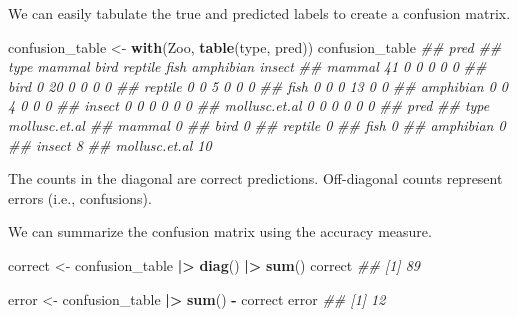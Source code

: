 \documentclass[
  notitlepage]{book}
\newenvironment{Shaded}{\begin{snugshade}}{\end{snugshade}}
\newcommand{\CommentTok}[1]{\textcolor[rgb]{0.56,0.35,0.01}{\textit{#1}}}
\newcommand{\ErrorTok}[1]{\textcolor[rgb]{0.64,0.00,0.00}{\textbf{#1}}}
\newcommand{\KeywordTok}[1]{\textcolor[rgb]{0.13,0.29,0.53}{\textbf{#1}}}
\newcommand{\NormalTok}[1]{#1}
\newcommand{\OperatorTok}[1]{\textcolor[rgb]{0.81,0.36,0.00}{\textbf{#1}}}
\newcommand{\StringTok}[1]{\textcolor[rgb]{0.31,0.60,0.02}{#1}}
\begin{document}
We can easily tabulate the true and predicted labels to create a
confusion matrix.

\begin{Shaded}
\begin{Highlighting}[]
\NormalTok{confusion\_table \textless{}{-}}\StringTok{ }\KeywordTok{with}\NormalTok{(Zoo, }\KeywordTok{table}\NormalTok{(type, pred))}
\NormalTok{confusion\_table}
\CommentTok{\#\#                pred}
\CommentTok{\#\# type            mammal bird reptile fish amphibian insect}
\CommentTok{\#\#   mammal            41    0       0    0         0      0}
\CommentTok{\#\#   bird               0   20       0    0         0      0}
\CommentTok{\#\#   reptile            0    0       5    0         0      0}
\CommentTok{\#\#   fish               0    0       0   13         0      0}
\CommentTok{\#\#   amphibian          0    0       4    0         0      0}
\CommentTok{\#\#   insect             0    0       0    0         0      0}
\CommentTok{\#\#   mollusc.et.al      0    0       0    0         0      0}
\CommentTok{\#\#                pred}
\CommentTok{\#\# type            mollusc.et.al}
\CommentTok{\#\#   mammal                    0}
\CommentTok{\#\#   bird                      0}
\CommentTok{\#\#   reptile                   0}
\CommentTok{\#\#   fish                      0}
\CommentTok{\#\#   amphibian                 0}
\CommentTok{\#\#   insect                    8}
\CommentTok{\#\#   mollusc.et.al            10}
\end{Highlighting}
\end{Shaded}

The counts in the diagonal are correct predictions. Off-diagonal
counts represent errors (i.e., confusions).

We can summarize the confusion matrix using the accuracy measure.

\begin{Shaded}
\begin{Highlighting}[]
\NormalTok{correct \textless{}{-}}\StringTok{ }\NormalTok{confusion\_table }\OperatorTok{|}\ErrorTok{\textgreater{}}\StringTok{ }\KeywordTok{diag}\NormalTok{() }\OperatorTok{|}\ErrorTok{\textgreater{}}\StringTok{ }\KeywordTok{sum}\NormalTok{()}
\NormalTok{correct}
\CommentTok{\#\# [1] 89}
\end{Highlighting}
\end{Shaded}

\begin{Shaded}
\begin{Highlighting}[]
\NormalTok{error \textless{}{-}}\StringTok{ }\NormalTok{confusion\_table }\OperatorTok{|}\ErrorTok{\textgreater{}}\StringTok{ }\KeywordTok{sum}\NormalTok{() }\OperatorTok{{-}}\StringTok{ }\NormalTok{correct}
\NormalTok{error}
\CommentTok{\#\# [1] 12}
\end{Highlighting}
\end{Shaded}
\end{document}
